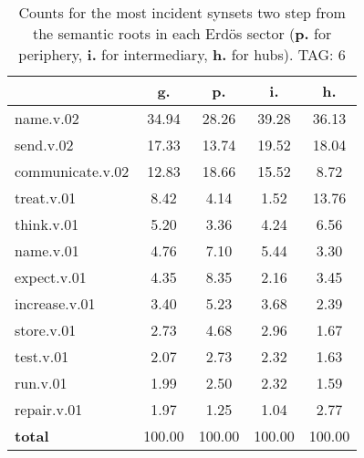 \begin{table}[h!]
\begin{center}
\begin{tabular}{| l || c | c | c | c |}\hline
 & {\bf g.} & {\bf p.} & {\bf i.} & {\bf h.} \\\hline\hline
name.v.02 & 34.94  & 28.26  & 39.28  & 36.13 \\\hline
send.v.02 & 17.33  & 13.74  & 19.52  & 18.04 \\\hline
communicate.v.02 & 12.83  & 18.66  & 15.52  & 8.72 \\\hline
treat.v.01 & 8.42  & 4.14  & 1.52  & 13.76 \\\hline
think.v.01 & 5.20  & 3.36  & 4.24  & 6.56 \\\hline
name.v.01 & 4.76  & 7.10  & 5.44  & 3.30 \\\hline
expect.v.01 & 4.35  & 8.35  & 2.16  & 3.45 \\\hline
increase.v.01 & 3.40  & 5.23  & 3.68  & 2.39 \\\hline
store.v.01 & 2.73  & 4.68  & 2.96  & 1.67 \\\hline
test.v.01 & 2.07  & 2.73  & 2.32  & 1.63 \\\hline
run.v.01 & 1.99  & 2.50  & 2.32  & 1.59 \\\hline
repair.v.01 & 1.97  & 1.25  & 1.04  & 2.77 \\\hline\hline
{{\bf total}} & 100.00  & 100.00  & 100.00  & 100.00 \\\hline
\end{tabular}
\caption{Counts for the most incident synsets two step from the semantic roots in each Erd\"os sector ({\bf p.} for periphery, {\bf i.} for intermediary, {\bf h.} for hubs). TAG: 6}
\end{center}
\end{table}
